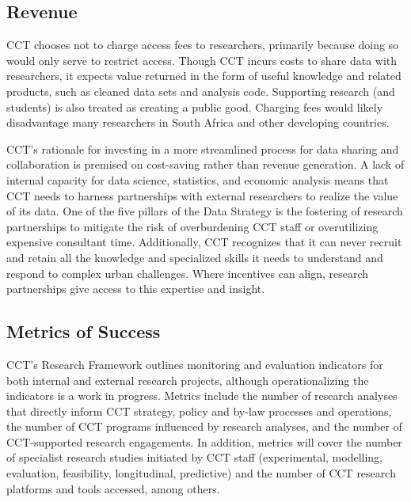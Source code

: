 \hypertarget{revenue-4}{%
\subsection{Revenue}\label{revenue-4}}

CCT chooses not to charge access fees to researchers, primarily because doing so would only serve to restrict access. Though CCT incurs costs to share data with researchers, it expects value returned in the form of useful knowledge and related products, such as cleaned data sets and analysis code. Supporting research (and students) is also treated as creating a public good. Charging fees would likely disadvantage many researchers in South Africa and other developing countries.

CCT's rationale for investing in a more streamlined process for data sharing and collaboration is premised on cost-saving rather than revenue generation. A lack of internal capacity for data science, statistics, and economic analysis means that CCT needs to harness partnerships with external researchers to realize the value of its data. One of the five pillars of the Data Strategy is the fostering of research partnerships to mitigate the risk of overburdening CCT staff or overutilizing expensive consultant time. Additionally, CCT recognizes that it can never recruit and retain all the knowledge and specialized skills it needs to understand and respond to complex urban challenges. Where incentives can align, research partnerships give access to this expertise and insight.

\hypertarget{metrics-of-success-4}{%
\subsection{Metrics of Success}\label{metrics-of-success-4}}

CCT's Research Framework outlines monitoring and evaluation indicators for both internal and external research projects, although operationalizing the indicators is a work in progress. Metrics include the number of research analyses that directly inform CCT strategy, policy and by-law processes and operations, the number of CCT programs influenced by research analyses, and the number of CCT-supported research engagements. In addition, metrics will cover the number of specialist research studies initiated by CCT staff (experimental, modelling, evaluation, feasibility, longitudinal, predictive) and the number of CCT research platforms and tools accessed, among others.

